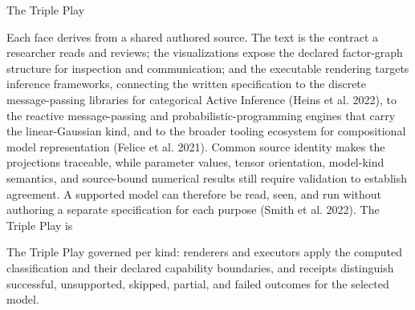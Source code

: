 \documentclass[
  ignorenonframetext,
]{beamer}
\begin{document}
\begin{frame}{The Triple Play}

Each face derives from a shared authored source. The text is the
contract a researcher reads and reviews; the visualizations expose the
declared factor-graph structure for inspection and communication; and
the executable rendering targets inference frameworks, connecting the
written specification to the discrete message-passing libraries for
categorical Active Inference (Heins et al. 2022), to the reactive
message-passing and probabilistic-programming engines that carry the
linear-Gaussian kind, and to the broader tooling ecosystem for
compositional model representation (Felice et al. 2021). Common source
identity makes the projections traceable, while parameter values, tensor
orientation, model-kind semantics, and source-bound numerical results
still require validation to establish agreement. A supported model can
therefore be read, seen, and run without authoring a separate
specification for each purpose (Smith et al. 2022). The Triple Play is
\end{frame}

\begin{frame}{The Triple Play}
governed per kind: renderers and executors apply the computed
classification and their declared capability boundaries, and receipts
distinguish successful, unsupported, skipped, partial, and failed
outcomes for the selected model.
\end{frame}
\end{document}
